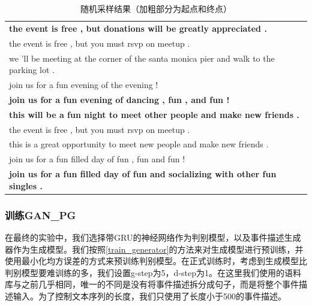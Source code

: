 \begin{table}[htbp]
    \center
    \caption{\label{t3-3}随机采样结果（加粗部分为起点和终点）}
    \begin{tabular*}{\linewidth}{p{\linewidth}}
\toprule
\textbf{the event is free , but donations will be greatly appreciated .}\\
the event is free , but you must rsvp on meetup . \\
we 'll be meeting at the corner of the santa monica pier and walk to the parking lot .\\
join us for a fun evening of the evening !\\
\textbf{join us for a fun evening of dancing , fun , and fun !}\\
\midrule
\textbf{this will be a fun night to meet other people and make new friends .}\\
the event is free , but you must rsvp on meetup . \\
this is a great opportunity to meet new people and make new friends .\\
join us for a fun filled day of fun , fun and fun ! \\
\textbf{join us for a fun filled day of fun and socializing with other fun singles . }\\
\bottomrule
    \end{tabular*}
\end{table}

\subsubsection{训练GAN\_PG}
在最终的实验中，我们选择带GRU的神经网络作为判别模型，以及事件描述生成器作为生成模型。我们按照\ref{train_generator}的方法来对生成模型进行预训练，并使用最小化均方误差的方式来预训练判别模型。在正式训练时，考虑到生成模型比判别模型要难训练的多，我们设置g-step为5，d-step为1。在这里我们使用的语料库与之前几乎相同，唯一的不同是没有将事件描述拆分成句子，而是将整个事件描述输入。为了控制文本序列的长度，我们只使用了长度小于500的事件描述。
